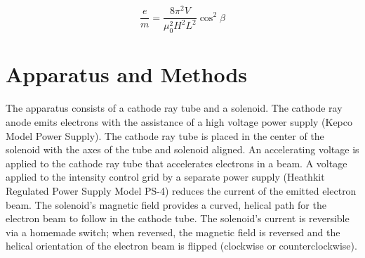 \documentclass[%
 aip,
 amsmath,amssymb,
 reprint,%
floatfix,
]{revtex4-1}
\begin{document}
\begin{equation}
	\frac{e}{m} = \frac{8 \pi^2 V}{\mu_0^2 H^2 L^2} \cos^2{\beta}
\end{equation}


\section{\label{sec:level3}Apparatus and Methods}

The apparatus consists of a cathode ray tube and a solenoid. The cathode ray anode emits electrons with the assistance of a high voltage power supply (Kepco Model Power Supply). The cathode ray tube is placed in the center of the solenoid with the axes of the tube and solenoid aligned. An accelerating voltage is applied to the cathode ray tube that accelerates electrons in a beam. A voltage applied to the intensity control grid by a separate power supply (Heathkit Regulated Power Supply Model PS-4) reduces the current of the emitted electron beam. The solenoid's magnetic field provides a curved, helical path for the electron beam to follow in the cathode tube. The solenoid's current is reversible via a homemade switch; when reversed, the magnetic field is reversed and the helical orientation of the electron beam is flipped (clockwise or counterclockwise).
\end{document}
